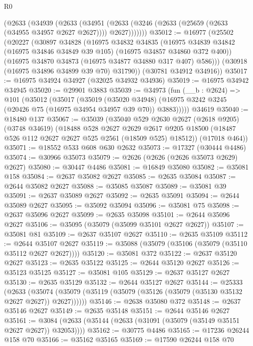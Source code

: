 \begin{lexlean}{R0}
\begin{coremodule}
      (@2633
        (@34939
          (@2633
            (@34951 (@2633 (@3246 (@2633 (@25659 (@2633 (@34955 @34957 @2627 @2627)))) @2627)))))))
@35012 := @16977
    (@25502
      (@20227
        (@30897
          @34828
          (@16975
            @34832
            @34835
            (@16975 @34839 @34842 (@16975 @34846 @34849 @39 @105) (@16975 @34857 @34860 @372 @400))
            (@16975 @34870 @34873 (@16975 @34877 @34880 @317 @407) @586)))
        (@30918 (@16975 @34896 @34899 @39 @70) @31790))
      (@30781 @34912 @34916))
@35017 := @16975 @34924 @34927 (@32025 @34932 @34936)
@35019 := @16975 @34942 @34945
@35020 := @29901 @3883
@35039 := @34973
    (fun (__b : @2624) =>
    @101
      (@35012
        (@35017
          (@35019
            (@35020 @34948)
            (@16975 @3242 @3245 (@20426 @75 (@16975 @34954 @34957 @39 @70)) @3883)))))
    @34619
@35040 := @18480 @137
@35067 := @35039
    (@35040
      @529
      @2630
      @2627
      (@2618 @9205)
      (@3748 @34619)
      (@18488
        @528
        @2627
        @2629
        @2617
        @9205
        @18500
        (@18487 @526 @112 @2627 @2627 @525 @2561 (@18509 @525) @18512))
      (@17018 @464))
@35071 := @18552 @533 @608 @630 @2632
@35073 := @17327 (@30444 @4486)
@35074 := @30966 @35073
@35079 := @2626 (@2626 (@2626 @35073 @2629) @2627)
@35080 := @30447 @4486
@35081 := @16849 @35080
@35082 := @35081 @158
@35084 := @2637 @35082 @2627
@35085 := @2635 @35084
@35087 := @2644 @35082 @2627
@35088 := @35085 @35087
@35089 := @35081 @39
@35091 := @2637 @35089 @2627
@35092 := @2635 @35091
@35094 := @2644 @35089 @2627
@35095 := @35092 @35094
@35096 := @35081 @75
@35098 := @2637 @35096 @2627
@35099 := @2635 @35098
@35101 := @2644 @35096 @2627
@35106 := @35095 (@35079 (@35099 @35101 @2627 @2627))
@35107 := @35081 @81
@35109 := @2637 @35107 @2627
@35110 := @2635 @35109
@35112 := @2644 @35107 @2627
@35119 := @35088 (@35079 (@35106 (@35079 (@35110 @35112 @2627 @2627))))
@35120 := @35081 @372
@35122 := @2637 @35120 @2627
@35123 := @2635 @35122
@35125 := @2644 @35120 @2627
@35126 := @35123 @35125
@35127 := @35081 @105
@35129 := @2637 @35127 @2627
@35130 := @2635 @35129
@35132 := @2644 @35127 @2627
@35144 := @25333
    (@2633 (@35074 (@35079 (@35119 (@35079 (@35126 (@35079 (@35130 @35132 @2627 @2627)) @2627))))))
@35146 := @2638 @35080 @372
@35148 := @2637 @35146 @2627
@35149 := @2635 @35148
@35151 := @2644 @35146 @2627
@35161 := @3084 (@2633 (@35144 (@2633 (@31091 (@35079 (@35149 @35151 @2627 @2627)) @32053))))
@35162 := @30775 @4486
@35165 := @17236 @26244 @158 @70
@35166 := @35162 @35165
@35169 := @17590 @26244 @158 @70

\end{coremodule}
\end{lexlean}
